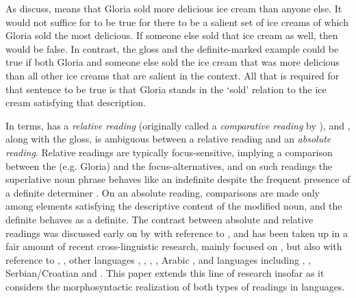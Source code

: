\documentclass[output=paper
,modfonts
,nonflat]{langsci/langscibook}
\begin{document}
As \citet{TelemanEtAlii1999} discuss,  means that Gloria sold more delicious ice cream than anyone else. It would not suffice for  to be true for there to be a salient set of ice creams of which Gloria sold the most delicious. If someone else sold that ice cream as well, then  would be false. In contrast, the  gloss and the definite-marked example  could be true if both Gloria and someone else sold the ice cream that was more delicious than all other ice creams that are salient in the context. All that is required for that sentence to be true is that Gloria stands in the `sold' relation to the ice cream satisfying that description.

In  terms,  has a \textit{relative reading} (originally called a \textit{comparative reading} by \citealt{Szabolcsi1986}), and , along with the  gloss, is ambiguous between a relative reading and an \textit{absolute reading}. Relative readings are typically focus-sensitive, implying a comparison between the  (e.g. Gloria) and the focus-alternatives, and on such readings the superlative noun phrase behaves like an indefinite despite the frequent presence of a definite determiner \citep{Szabolcsi1986,CoppockBeaver2014}. On an absolute reading, comparisons are made only among elements satisfying the descriptive content of the modified noun, and the definite behaves as a definite. The contrast between absolute and relative readings was discussed early on by \citet{Szabolcsi1986} with  reference to , and has been taken up in a fair amount of recent cross-linguistic research, mainly focused on  \citep{Gawron1995,Heim1999,Hackl2000,SharvitStateva2002,Hackl2009,Teodorescu2009,Krasikova2012,Szabolcsi2012,Bumford2016,Wilson2016}, but also with reference to  \citep{Hackl2009},  \citep{CoppockJosefson2015}, other  languages \citep{Coppocktoappear},  \citep{FarkasKiss2000},  \citep{Teodorescu2007},  \citep{Rohena-Madrazo2007}, Arabic \citep{Hallman2016}, and  languages including , , Serbian/Croatian and  \citep{PanchevaTomaszewicz2012}. This paper extends this line of research insofar as it considers the morphosyntactic realization of both types of readings in  languages.
\end{document}
